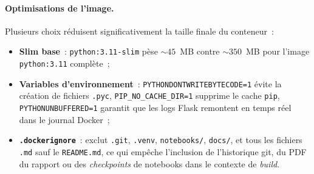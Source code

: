 \documentclass[a4paper,11pt]{article}
\begin{document}
\paragraph{Optimisations de l'image.}
Plusieurs choix réduisent significativement la taille finale du
conteneur~:
\begin{itemize}
    \item \textbf{Slim base}~: \texttt{python:3.11-slim} pèse $\sim 45$~MB
    contre $\sim 350$~MB pour l'image \texttt{python:3.11} complète~;
    \item \textbf{Variables d'environnement}~:
    \texttt{PYTHONDONTWRITEBYTECODE=1} évite la création de fichiers
    \texttt{.pyc}, \texttt{PIP\_NO\_CACHE\_DIR=1} supprime le cache
    \texttt{pip}, \texttt{PYTHONUNBUFFERED=1} garantit que les logs
    Flask remontent en temps réel dans le journal Docker~;
    \item \textbf{\texttt{.dockerignore}}~: exclut \texttt{.git},
    \texttt{.venv}, \texttt{notebooks/}, \texttt{docs/}, et tous les
    fichiers \texttt{.md} sauf le \texttt{README.md}, ce qui empêche
    l'inclusion de l'historique git, du PDF du rapport ou des
    \textit{checkpoints} de notebooks dans le contexte de \textit{build}.
\end{itemize}
\end{document}
